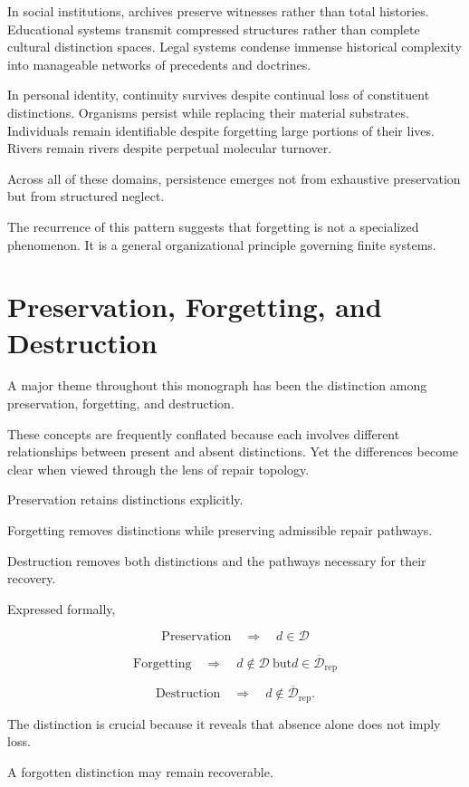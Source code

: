 \documentclass[12pt,oneside]{book}
\theoremstyle{plain} \newtheorem{theorem}{Theorem}[chapter] \newtheorem{lemma}[theorem]{Lemma} \newtheorem{proposition}[theorem]{Proposition} \newtheorem{corollary}[theorem]{Corollary}
\theoremstyle{definition} \newtheorem{definition}[theorem]{Definition} \newtheorem{axiom}[theorem]{Axiom} \newtheorem{construction}[theorem]{Construction}
\theoremstyle{remark} \newtheorem{remark}[theorem]{Remark} \newtheorem{example}[theorem]{Example}
\newcommand{\D}{\mathcal{D}} \newcommand{\R}{\mathcal{R}} \newcommand{\F}{\mathcal{F}} \newcommand{\U}{\mathcal{U}} \newcommand{\M}{\mathcal{M}} \newcommand{\G}{\Gamma}
\begin{document}
In social institutions, archives preserve witnesses rather than total histories. Educational systems transmit compressed structures rather than complete cultural distinction spaces. Legal systems condense immense historical complexity into manageable networks of precedents and doctrines.

In personal identity, continuity survives despite continual loss of constituent distinctions. Organisms persist while replacing their material substrates. Individuals remain identifiable despite forgetting large portions of their lives. Rivers remain rivers despite perpetual molecular turnover.

Across all of these domains, persistence emerges not from exhaustive preservation but from structured neglect.

The recurrence of this pattern suggests that forgetting is not a specialized phenomenon. It is a general organizational principle governing finite systems.

\section{Preservation, Forgetting, and Destruction}

A major theme throughout this monograph has been the distinction among preservation, forgetting, and destruction.

These concepts are frequently conflated because each involves different relationships between present and absent distinctions. Yet the differences become clear when viewed through the lens of repair topology.

Preservation retains distinctions explicitly.

Forgetting removes distinctions while preserving admissible repair pathways.

Destruction removes both distinctions and the pathways necessary for their recovery.

Expressed formally,

\[
\text{Preservation}
\quad\Rightarrow\quad
d\in\D
\]

\[
\text{Forgetting}
\quad\Rightarrow\quad
d\notin\D
\ \text{but}
d\in
\overline{\D}_{\mathrm{rep}}
\]

\[
\text{Destruction}
\quad\Rightarrow\quad
d\notin
\overline{\D}_{\mathrm{rep}}.
\]

The distinction is crucial because it reveals that absence alone does not imply loss.

A forgotten distinction may remain recoverable.
\end{document}
